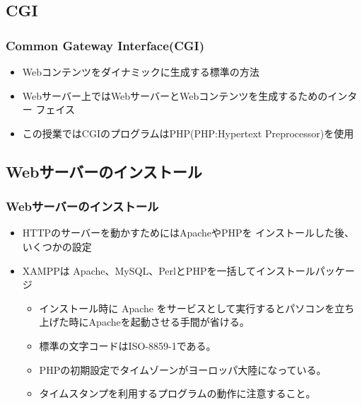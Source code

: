 \documentclass[dvipsk]{beamer}
\begin{document}
\subsection{CGI}
\begin{frame}[containsverbatim]
\frametitle{Common Gateway Interface(CGI)}
\begin{itemize}
 \item Webコンテンツをダイナミックに生成する標準の方法
 \item Webサーバー上ではWebサーバーとWebコンテンツを生成するためのインター
       フェイス
 \item この授業ではCGIのプログラムはPHP(PHP:Hypertext Preprocessor)を使用
\end{itemize}
\end{frame}
\subsection{Webサーバーのインストール}
\begin{frame}[containsverbatim]
\frametitle{Webサーバーのインストール}
\begin{itemize}
 \item HTTPのサーバーを動かすためにはApacheやPHPを
インストールした後、いくつかの設定
 \item XAMPPは Apache、MySQL、PerlとPHPを一括してインストールパッケージ
\begin{itemize}
  \item インストール時に Apache をサービスとして実行するとパソコンを立ち
       上げた時にApacheを起動させる手間が省ける。
 \item 標準の文字コードは{ISO-8859-1}である。
 \item PHPの初期設定でタイムゾーンがヨーロッパ大陸になっている。
 \item タイムスタンプを利用するプログラムの動作に注意すること。
\end{itemize}
\end{itemize}
\end{frame}
\end{document}
